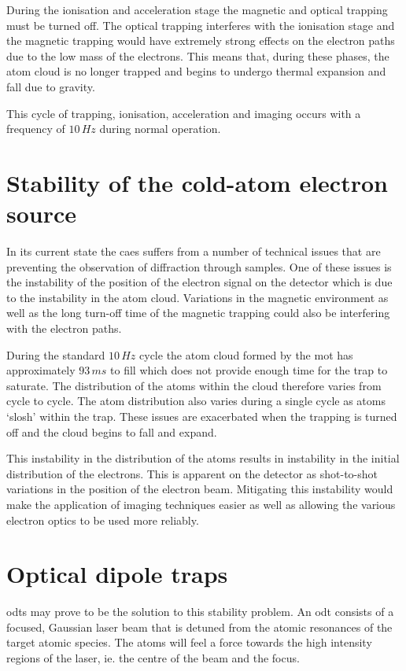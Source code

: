 During the ionisation and acceleration stage the magnetic and optical trapping must be turned off. The optical trapping interferes with the ionisation stage and the magnetic trapping would have extremely strong effects on the electron paths due to the low mass of the electrons. This means that, during these phases, the atom cloud is no longer trapped and begins to undergo thermal expansion and fall due to gravity.

This cycle of trapping, ionisation, acceleration and imaging occurs with a frequency of $10\,\unit{Hz}$ during normal operation.

\section{Stability of the cold-atom electron source}

In its current state the \gls{caes} suffers from a number of technical issues that are preventing the observation of diffraction through samples. One of these issues is the instability of the position of the electron signal on the detector which is due to the instability in the atom cloud. Variations in the magnetic environment as well as the long turn-off time of the magnetic trapping could also be interfering with the electron paths.

During the standard $10\,\unit{Hz}$ cycle the atom cloud formed by the \gls{mot} has approximately $93\,\unit{ms}$ to fill which does not provide enough time for the trap to saturate. The distribution of the atoms within the cloud therefore varies from cycle to cycle. The atom distribution also varies during a single cycle as atoms `slosh' within the trap. These issues are exacerbated when the trapping is turned off and the cloud begins to fall and expand.

This instability in the distribution of the atoms results in instability in the initial distribution of the electrons. This is apparent on the detector as shot-to-shot variations in the position of the electron beam. Mitigating this instability would make the application of imaging techniques easier as well as allowing the various electron optics to be used more reliably.

\section{Optical dipole traps}

\Glspl{odt} may prove to be the solution to this stability problem. An \gls{odt} consists of a focused, Gaussian laser beam that is detuned from the atomic resonances of the target atomic species. The atoms will feel a force towards the high intensity regions of the laser, ie. the centre of the beam and the focus.

